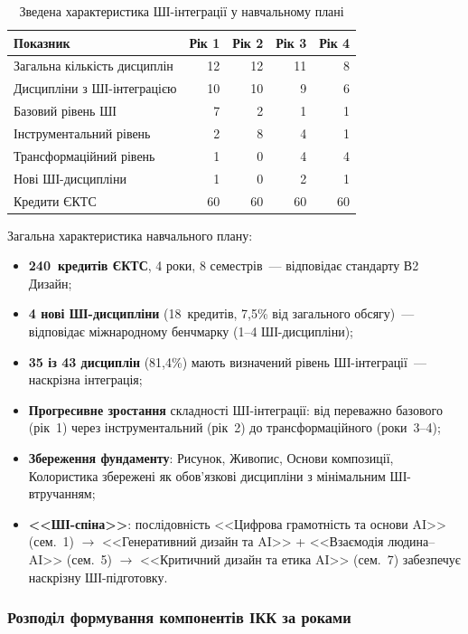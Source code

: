 \begin{table}[htbp]
\centering
\caption{Зведена характеристика ШІ-інтеграції у навчальному плані}\label{tab:curriculum-summary}
\small
\begin{tabularx}{\textwidth}{@{}Xrrrr@{}}
\toprule
\textbf{Показник} & \textbf{Рік 1} & \textbf{Рік 2} & \textbf{Рік 3} & \textbf{Рік 4} \\
\midrule
Загальна кількість дисциплін & 12 & 12 & 11 & 8 \\
Дисципліни з ШІ-інтеграцією & 10 & 10 & 9 & 6 \\
\addlinespace
Базовий рівень ШІ & 7 & 2 & 1 & 1 \\
Інструментальний рівень & 2 & 8 & 4 & 1 \\
Трансформаційний рівень & 1 & 0 & 4 & 4 \\
\addlinespace
Нові ШІ-дисципліни & 1 & 0 & 2 & 1 \\
Кредити ЄКТС & 60 & 60 & 60 & 60 \\
\bottomrule
\end{tabularx}
\end{table}

Загальна характеристика навчального плану:
\begin{itemize}
    \item \textbf{240~кредитів ЄКТС}, 4 роки, 8 семестрів~--- відповідає стандарту В2 Дизайн;
    \item \textbf{4 нові ШІ-дисципліни} (18~кредитів, 7,5\% від загального обсягу)~--- відповідає міжнародному бенчмарку (1--4 ШІ-дисципліни);
    \item \textbf{35 із 43 дисциплін} (81,4\%) мають визначений рівень ШІ-інтеграції~--- наскрізна інтеграція;
    \item \textbf{Прогресивне зростання} складності ШІ-інтеграції: від переважно базового (рік~1) через інструментальний (рік~2) до трансформаційного (роки~3--4);
    \item \textbf{Збереження фундаменту}: Рисунок, Живопис, Основи композиції, Колористика збережені як обов'язкові дисципліни з мінімальним ШІ-втручанням;
    \item \textbf{<<ШІ-спіна>>}: послідовність <<Цифрова грамотність та основи AI>> (сем.~1) $\to$ <<Генеративний дизайн та AI>> + <<Взаємодія людина--AI>> (сем.~5) $\to$ <<Критичний дизайн та етика AI>> (сем.~7) забезпечує наскрізну ШІ-підготовку.
\end{itemize}

\subsubsection{Розподіл формування компонентів ІКК за роками}\label{sssec:3.2.11}

